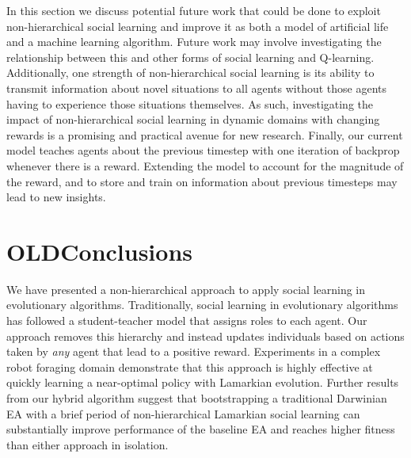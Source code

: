 \documentclass{acm_proc_article-sp}
\begin{document}
In this section we discuss potential future work that could be done to exploit non-hierarchical social learning and improve it as both a model of artificial life and a machine learning algorithm. Future work may involve investigating the relationship between this and other forms of social learning and Q-learning. Additionally, one strength of non-hierarchical social learning is its ability to transmit information about novel situations to all agents without those agents having to experience those situations themselves. As such, investigating the impact of non-hierarchical social learning in dynamic domains with changing rewards is a promising and practical avenue for new research. Finally, our current model teaches agents about the previous timestep with one iteration of backprop whenever there is a reward. Extending the model to account for the magnitude of the reward, and to store and train on information about previous timesteps may lead to new insights.


\section{OLDConclusions}
\label{sec:conclusions}
We have presented a non-hierarchical approach to apply social learning in evolutionary algorithms. Traditionally, social learning in evolutionary algorithms has followed a student-teacher model that assigns roles to each agent. Our approach removes this hierarchy and instead updates individuals based on actions taken by \textit{any} agent that lead to a positive reward. Experiments in a complex robot foraging domain demonstrate that this approach is highly effective at quickly learning a near-optimal policy with Lamarkian evolution. Further results from our hybrid algorithm suggest that bootstrapping a traditional Darwinian EA with a brief period of non-hierarchical Lamarkian social learning can substantially improve performance of the baseline EA and reaches higher fitness than either approach in isolation.


\end{document}
